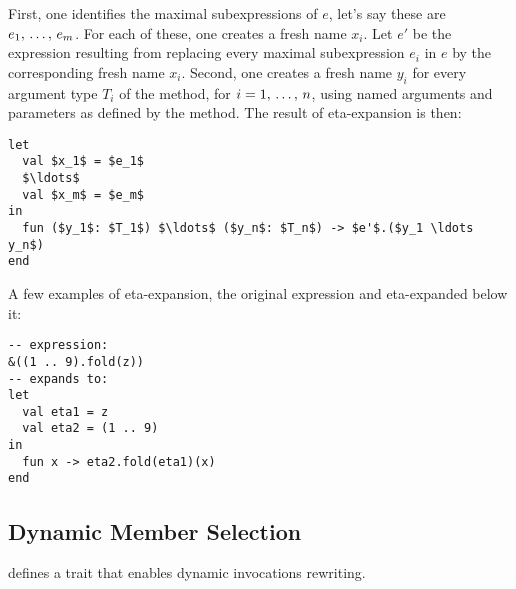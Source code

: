 First, one identifies the maximal subexpressions of $e$, let's say these are $e_1 ,\, \ldots ,\, e_m$. For each of these, one creates a fresh name $x_i$. Let $e'$ be the expression resulting from replacing every maximal subexpression $e_i$ in $e$ by the corresponding fresh name $x_i$. Second, one creates a fresh name $y_i$ for every argument type $T_i$ of the method, for $i = 1 ,\, \ldots ,\, n$, using named arguments and parameters as defined by the method. The result of eta-expansion is then: 
\begin{lstlisting}
let 
  val $x_1$ = $e_1$
  $\ldots$
  val $x_m$ = $e_m$ 
in
  fun ($y_1$: $T_1$) $\ldots$ ($y_n$: $T_n$) -> $e'$.($y_1 \ldots y_n$)
end
\end{lstlisting}

\example A few examples of eta-expansion, the original expression and eta-expanded below it:
\begin{lstlisting}
-- expression:
&((1 .. 9).fold(z))
-- expands to:
let 
  val eta1 = z
  val eta2 = (1 .. 9) 
in
  fun x -> eta2.fold(eta1)(x)
end
\end{lstlisting}







\subsection{Dynamic Member Selection}
\label{sec:dynamic-member-selection}

\Aml defines a trait  that enables dynamic invocations rewriting. 











